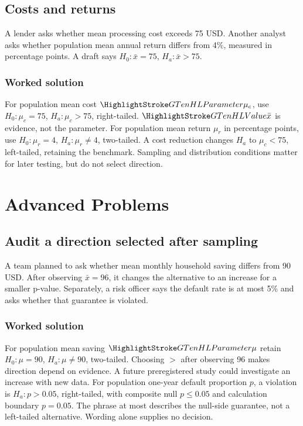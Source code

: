 \subsection{Costs and returns}\label{prob:notation}
A lender asks whether mean processing cost exceeds 75 USD. Another analyst asks whether population mean annual return differs from 4\%, measured in percentage points. A draft says $H_0:\bar x=75$, $H_a:\bar x>75$.
\subsubsection*{Worked solution}\label{sol:notation}
For population mean cost $\Pop{\mu_c}$, use $H_0:\mu_c=75$, $H_a:\mu_c>75$, right-tailed. $\Obs{\bar x}$ is evidence, not the parameter. For population mean return $\mu_r$ in percentage points, use $H_0:\mu_r=4$, $H_a:\mu_r\ne4$, two-tailed. A cost reduction changes $H_a$ to $\mu_c<75$, left-tailed, retaining the benchmark. Sampling and distribution conditions matter for later testing, but do not select direction.
\section{Advanced Problems}\label{sec:advanced}
\subsection{Audit a direction selected after sampling}\label{prob:audit}
A team planned to ask whether mean monthly household saving differs from 90 USD. After observing $\bar x=96$, it changes the alternative to an increase for a smaller p-value. Separately, a risk officer says the default rate is at most 5\% and asks whether that guarantee is violated.
\subsubsection*{Worked solution}\label{sol:audit}
For population mean saving $\Pop{\mu}$ retain $H_0:\mu=90$, $H_a:\mu\ne90$, two-tailed. Choosing $>$ after observing 96 makes direction depend on evidence. A future preregistered study could investigate an increase with new data. For population one-year default proportion $p$, a violation is $H_a:p>0.05$, right-tailed, with composite null $p\le0.05$ and calculation boundary $p=0.05$. The phrase at most describes the null-side guarantee, not a left-tailed alternative. Wording alone supplies no decision.


